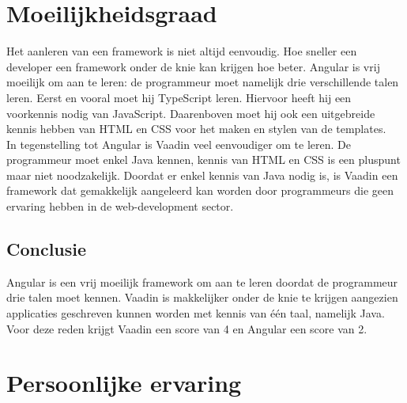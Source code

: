 \section{Moeilijkheidsgraad}
Het aanleren van een framework is niet altijd eenvoudig. Hoe sneller een developer een framework onder de knie kan krijgen hoe beter. 
Angular is vrij moeilijk om aan te leren: de programmeur moet namelijk drie verschillende talen leren.
Eerst en vooral moet hij TypeScript leren. Hiervoor heeft hij een voorkennis nodig van JavaScript. Daarenboven moet hij ook een uitgebreide kennis hebben van HTML en CSS voor het maken en stylen van de templates.
\\
In tegenstelling tot Angular is Vaadin veel eenvoudiger om te leren. De programmeur moet enkel Java kennen, kennis van HTML en CSS is een pluspunt maar niet noodzakelijk.
Doordat er enkel kennis van Java nodig is, is Vaadin een framework dat gemakkelijk aangeleerd kan worden door programmeurs die geen ervaring hebben in de web-development sector.

\subsection{Conclusie}
Angular is een vrij moeilijk framework om aan te leren doordat de programmeur drie talen moet kennen. Vaadin is makkelijker onder de knie te krijgen aangezien applicaties geschreven kunnen worden met kennis van één taal, namelijk Java. 
Voor deze reden krijgt Vaadin een score van 4 en Angular een score van 2.

\section{Persoonlijke ervaring}



 